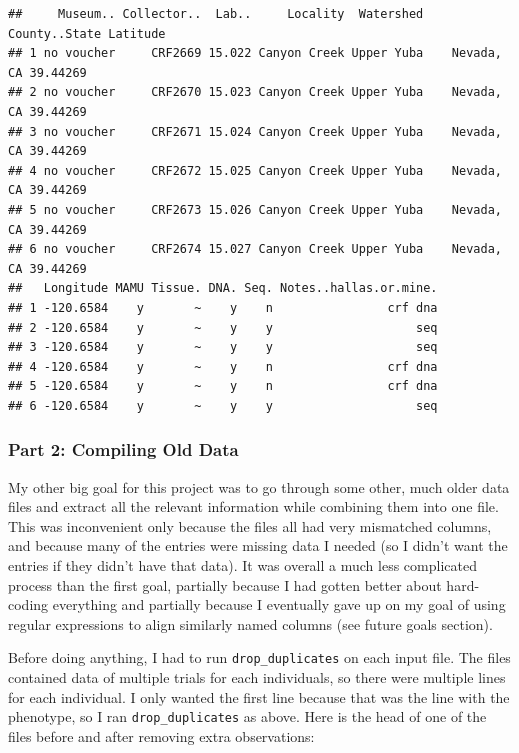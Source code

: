 \documentclass[
]{article}
\begin{document}
\begin{verbatim}
##     Museum.. Collector..  Lab..     Locality  Watershed County..State Latitude
## 1 no voucher     CRF2669 15.022 Canyon Creek Upper Yuba    Nevada, CA 39.44269
## 2 no voucher     CRF2670 15.023 Canyon Creek Upper Yuba    Nevada, CA 39.44269
## 3 no voucher     CRF2671 15.024 Canyon Creek Upper Yuba    Nevada, CA 39.44269
## 4 no voucher     CRF2672 15.025 Canyon Creek Upper Yuba    Nevada, CA 39.44269
## 5 no voucher     CRF2673 15.026 Canyon Creek Upper Yuba    Nevada, CA 39.44269
## 6 no voucher     CRF2674 15.027 Canyon Creek Upper Yuba    Nevada, CA 39.44269
##   Longitude MAMU Tissue. DNA. Seq. Notes..hallas.or.mine.
## 1 -120.6584    y       ~    y    n                crf dna
## 2 -120.6584    y       ~    y    y                    seq
## 3 -120.6584    y       ~    y    y                    seq
## 4 -120.6584    y       ~    y    n                crf dna
## 5 -120.6584    y       ~    y    n                crf dna
## 6 -120.6584    y       ~    y    y                    seq
\end{verbatim}

\hypertarget{part-2-compiling-old-data}{%
\subsubsection{Part 2: Compiling Old
Data}\label{part-2-compiling-old-data}}

My other big goal for this project was to go through some other, much
older data files and extract all the relevant information while
combining them into one file. This was inconvenient only because the
files all had very mismatched columns, and because many of the entries
were missing data I needed (so I didn't want the entries if they didn't
have that data). It was overall a much less complicated process than the
first goal, partially because I had gotten better about hard-coding
everything and partially because I eventually gave up on my goal of
using regular expressions to align similarly named columns (see future
goals section).

Before doing anything, I had to run \texttt{drop\_duplicates} on each
input file. The files contained data of multiple trials for each
individuals, so there were multiple lines for each individual. I only
wanted the first line because that was the line with the phenotype, so I
ran \texttt{drop\_duplicates} as above. Here is the head of one of the
files before and after removing extra observations:
\end{document}
